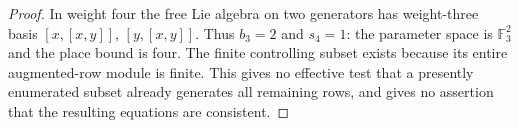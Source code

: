 \begin{proof}
In weight four the free Lie algebra
on two generators has weight-three
basis $[x,[x,y]]$, $[y,[x,y]]$.
Thus $b_3=2$ and $s_4=1$:
the parameter space is $\mathbb F_3^2$
and the place bound is four.
The finite controlling subset exists
because its entire augmented-row
module is finite. This gives no
effective test that a presently
enumerated subset already generates
all remaining rows, and gives no
assertion that the resulting equations
are consistent.
\end{proof}
